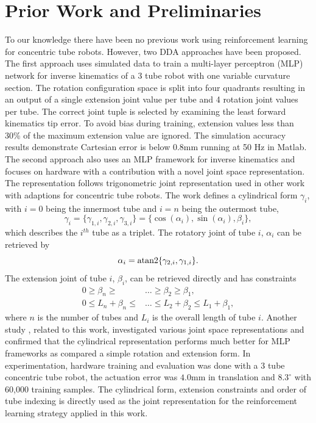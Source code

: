 \section{Prior Work and Preliminaries}
\label{prelims}
To our knowledge there have been no previous work using reinforcement learning for concentric tube robots. However, two DDA approaches have been proposed. The first approach \cite{Bergeles2015} uses simulated data to train a multi-layer perceptron (MLP) network for inverse kinematics of a 3 tube robot with one variable curvature section. The rotation configuration space is split into four quadrants resulting in an output of a single extension joint value per tube and 4 rotation joint values per tube. The correct joint tuple is selected by examining the least forward kinematics tip error. To avoid bias during training, extension values less than 30\% of the maximum extension value are ignored. The simulation accuracy results demonstrate Cartesian error is below 0.8mm running at 50 Hz in Matlab. The second approach \cite{Grassmann2018} also uses an MLP framework for inverse kinematics and focuses on hardware with a contribution with a novel joint space representation. The representation follows trigonometric joint representation used in other work with adaptions for concentric tube robots. The work defines a cylindrical form $\gamma_i$, with $i=0$ being the innermost tube and $i=n$ being the outermost tube,
\begin{equation}
\gamma_i = \{ \gamma_{1,i}, \gamma_{2,i}, \gamma_{3,i} \} = \{ \cos(\alpha_i), \sin(\alpha_i), \beta_i \},\label{eqn:cylindrical-representation}
\end{equation}
which describes the $i^{th}$ tube as a triplet. The rotatory joint of tube $i$,  $\alpha_i$ can be retrieved by
\begin{equation}
\alpha_i = \textnormal{atan2} \{ \gamma_{2,i}, \gamma_{1,i} \}. \label{eqn:alpha}
\end{equation}
The extension joint of tube $i$, $\beta_i$, can be retrieved directly and has constraints
\begin{align}
0 \geq \beta_n \geq & \dots \geq \beta_2 \geq \beta_1, \label{eqn:beta-constraints} \\
0 \leq L_n + \beta_n \leq & \dots \leq L_2 + \beta_2 \leq L_1 + \beta_1, \label{eqn:extension-constraints}
\end{align}
where $n$ is the number of tubes and $L_i$ is the overall length of tube $i$. Another study \cite{Grassmann2019}, related to this work, investigated various joint space representations and confirmed that the cylindrical representation performs much better for MLP frameworks as compared a simple rotation and extension form. In experimentation, hardware training and evaluation was done with a 3 tube concentric tube robot, the actuation error was $4.0$mm in translation and $8.3 ^{\circ}$ with 60,000 training samples. The cylindrical form, extension constraints and order of tube indexing is directly used as the joint representation for the reinforcement learning strategy applied in this work.

